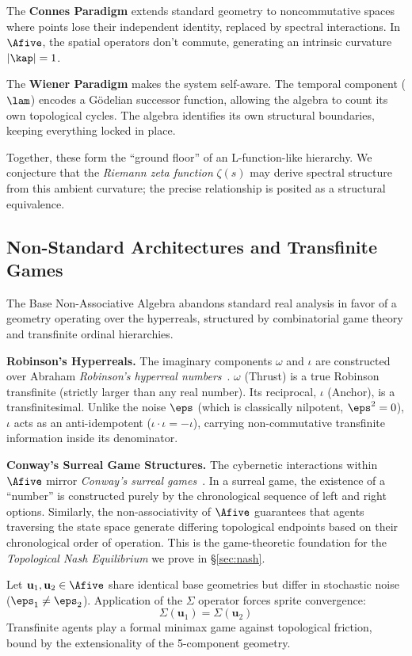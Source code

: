 The \textbf{Connes Paradigm} extends standard geometry to noncommutative spaces where points lose their independent identity, replaced by spectral interactions. In $\Afive$, the spatial operators don't commute, generating an intrinsic curvature $|\kap| = 1$.

The \textbf{Wiener Paradigm} makes the system self-aware. The temporal component ($\lam$) encodes a G\"odelian successor function, allowing the algebra to count its own topological cycles. The algebra identifies its own structural boundaries, keeping everything locked in place.

Together, these form the ``ground floor'' of an L-function-like hierarchy. We conjecture that the \emph{Riemann zeta function} $\zeta(s)$ may derive spectral structure from this ambient curvature; the precise relationship is posited as a structural equivalence.

\subsection{Non-Standard Architectures and Transfinite Games}

The Base Non-Associative Algebra abandons standard real analysis in favor of a geometry operating over the hyperreals, structured by combinatorial game theory and transfinite ordinal hierarchies.

\textbf{Robinson's Hyperreals.} The imaginary components $\omega$ and $\iota$ are constructed over Abraham \emph{Robinson's hyperreal numbers}~\cite{robinson}. $\omega$ (Thrust) is a true Robinson transfinite (strictly larger than any real number). Its reciprocal, $\iota$ (Anchor), is a transfinitesimal. Unlike the noise $\eps$ (which is classically nilpotent, $\eps^2 = 0$), $\iota$ acts as an anti-idempotent ($\iota \cdot \iota = -\iota$), carrying non-commutative transfinite information inside its denominator.

\textbf{Conway's Surreal Game Structures.} The cybernetic interactions within $\Afive$ mirror \emph{Conway's surreal games}~\cite{conway}. In a surreal game, the existence of a ``number'' is constructed purely by the chronological sequence of left and right options. Similarly, the non-associativity of $\Afive$ guarantees that agents traversing the state space generate differing topological endpoints based on their chronological order of operation. This is the game-theoretic foundation for the \emph{Topological Nash Equilibrium} we prove in \S\ref{sec:nash}.

\begin{theorem}\label{thm:game-ext}
Let $\mathbf{u}_1, \mathbf{u}_2 \in \Afive$ share identical base geometries but differ in stochastic noise ($\eps_1 \neq \eps_2$). Application of the $\Sigma$ operator forces sprite convergence:
$$\Sigma(\mathbf{u}_1) = \Sigma(\mathbf{u}_2)$$
Transfinite agents play a formal minimax game against topological friction, bound by the extensionality of the 5-component geometry.
\end{theorem}

